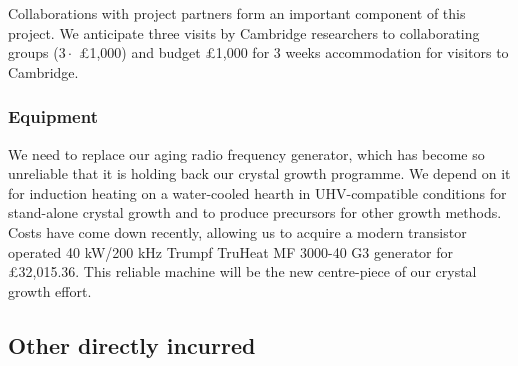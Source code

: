 \documentclass[prl,a4paper,11pt]{revtex4-2}
\begin{document}
\begin{singlespace}
Collaborations with project partners form an important component of this project. We anticipate three visits by Cambridge researchers to collaborating groups ($3\cdot$ \pounds 1,000) and budget \pounds 1,000 for 3 weeks accommodation for visitors to Cambridge.


\subsubsection{Equipment}
\noindent We need to replace our aging radio frequency generator, which has become so unreliable that it is holding back our crystal growth programme. We depend on it for induction heating on a water-cooled hearth in UHV-compatible conditions for stand-alone crystal growth and to produce precursors for other growth methods. Costs have come down recently, allowing us to acquire a modern transistor operated 40 kW/200 kHz Trumpf TruHeat MF 3000-40 G3 generator for \pounds 32,015.36. This reliable machine will be the new centre-piece of our  crystal growth effort.

\subsection{Other directly incurred}
\noindent



\end{singlespace}
\end{document}
